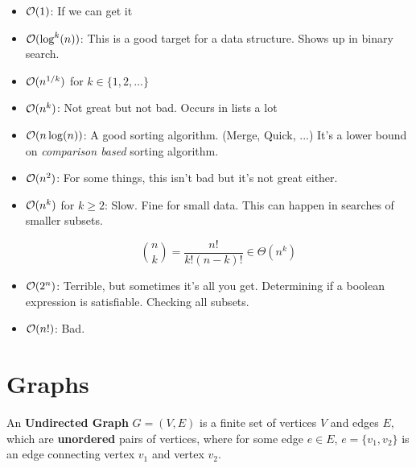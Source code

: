\documentclass[12pt]{article}
\begin{document}
  \begin{itemize}
    \item $\mathcal O(1)$: If we can get it

    \item $\mathcal O(\log^{k}(n))$: This is a good target for a data structure. Shows up in binary
          search.

    \item $\mathcal O(n^{1 / k})$ for $k \in \{1, 2, \dots\}$

    \item $\mathcal O(n^k)$: Not great but not bad. Occurs in lists a lot

    \item $\mathcal O(n\log(n))$: A good sorting algorithm. (Merge, Quick, ...) It's a lower
          bound on {\it comparison based} sorting algorithm.

    \item $\mathcal O(n^2)$: For some things, this isn't bad but it's not great either.

    \item $\mathcal O(n^k)$ for $k \ge 2$: Slow. Fine for small data. This can happen in
          searches of smaller subsets.

          \[
            \binom{n}{k} = \frac{n!}{k!(n - k)!} \in \Theta(n^k)
          \]

    \item $\mathcal O(2^n)$: Terrible, but sometimes it's all you get. Determining if a boolean
          expression is satisfiable. Checking all subsets.

    \item $\mathcal O(n!)$: Bad.
  \end{itemize}


  \newpage

  \section{Graphs}


   {
    An {\bf Undirected Graph} $G = (V, E)$ is a finite set of vertices $V$ and edges $E$,
    which are {\bf unordered} pairs of vertices, where for some edge $e \in E$, $e
    = \{v_1, v_2\}$ is an edge connecting vertex $v_1$ and vertex $v_2$.
  }
\end{document}

